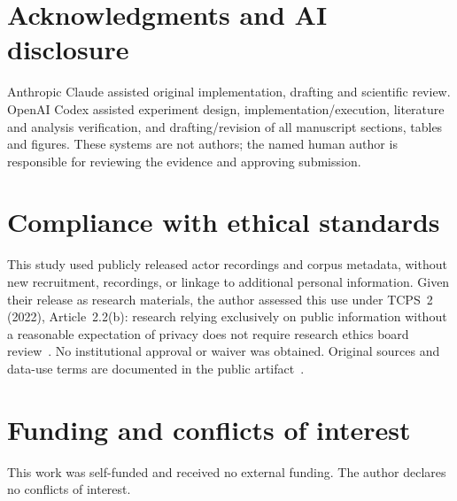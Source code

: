 \documentclass[letterpaper]{article}
\begin{document}
\section{Acknowledgments and AI disclosure}
Anthropic Claude assisted original implementation, drafting and scientific review. OpenAI Codex assisted experiment design, implementation/execution, literature and analysis verification, and drafting/revision of all manuscript sections, tables and figures. These systems are not authors; the named human author is responsible for reviewing the evidence and approving submission.
\clearpage
\section{Compliance with ethical standards}
This study used publicly released actor recordings and corpus metadata, without new recruitment, recordings, or linkage to additional personal information. Given their release as research materials, the author assessed this use under TCPS~2 (2022), Article~2.2(b): research relying exclusively on public information without a reasonable expectation of privacy does not require research ethics board review~\cite{tcps}. No institutional approval or waiver was obtained. Original sources and data-use terms are documented in the public artifact~\cite{artifact}.

\section{Funding and conflicts of interest}
This work was self-funded and received no external funding. The author declares no conflicts of interest.
\end{document}
